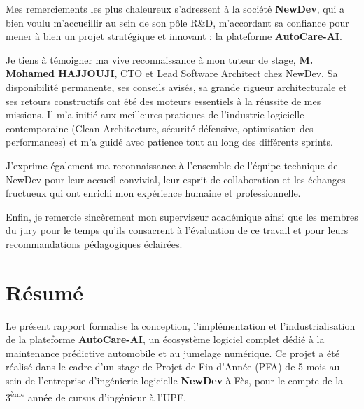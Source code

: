 \documentclass[12pt,a4paper,oneside]{report}
\begin{document}
Mes remerciements les plus chaleureux s'adressent \`a la soci\'et\'e \textbf{NewDev}, qui a bien voulu m'accueillir au sein de son p\^ole R\&D, m'accordant sa confiance pour mener \`a bien un projet strat\'egique et innovant : la plateforme \textbf{AutoCare-AI}.

Je tiens \`a t\'emoigner ma vive reconnaissance \`a mon tuteur de stage, \textbf{M. Mohamed HAJJOUJI}, CTO et Lead Software Architect chez NewDev. Sa disponibilit\'e permanente, ses conseils avis\'es, sa grande rigueur architecturale et ses retours constructifs ont \'et\'e des moteurs essentiels \`a la r\'eussite de mes missions. Il m'a initi\'e aux meilleures pratiques de l'industrie logicielle contemporaine (Clean Architecture, s\'ecurit\'e d\'efensive, optimisation des performances) et m'a guid\'e avec patience tout au long des diff\'erents sprints.

J'exprime \'egalement ma reconnaissance \`a l'ensemble de l'\'equipe technique de NewDev pour leur accueil convivial, leur esprit de collaboration et les \'echanges fructueux qui ont enrichi mon exp\'erience humaine et professionnelle.

Enfin, je remercie sinc\`erement mon superviseur acad\'emique ainsi que les membres du jury pour le temps qu'ils consacrent \`a l'\'evaluation de ce travail et pour leurs recommandations p\'edagogiques \'eclair\'ees.

\clearpage

\chapter*{R\'esum\'e}

Le pr\'esent rapport formalise la conception, l'impl\'ementation et l'industrialisation de la plateforme \textbf{AutoCare-AI}, un \'ecosyst\`eme logiciel complet d\'edi\'e \`a la maintenance pr\'edictive automobile et au jumelage num\'erique. Ce projet a \'et\'e r\'ealis\'e dans le cadre d'un stage de Projet de Fin d'Ann\'ee (PFA) de 5 mois au sein de l'entreprise d'ing\'enierie logicielle \textbf{NewDev} \`a F\`es, pour le compte de la 3\textsuperscript{ème} ann\'ee de cursus d'ing\'enieur \`a l'UPF.
\end{document}
